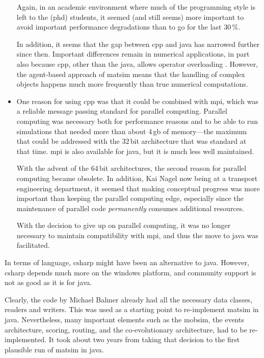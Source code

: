 \begin{itemize}
Again, in an academic environment where much of the programming style is left to the (\gls{phd}) students, it seemed (and still seems) more important to avoid important performance degradations than to go for the last 30\,\%.


In addition, it seems that the gap between \gls{cpp} and \gls{java} has narrowed further since then.  Important differences remain in numerical applications, in part also because \gls{cpp}, other than the \gls{java}, allows operator overloading \citep{..}.  However, the agent-based approach of \gls{matsim} means that the handling of complex objects happens much more frequently than true numerical computations.

\item One reason for using \gls{cpp} was that it could be combined with \gls{mpi}, which was a reliable message passing standard for parallel computing.  Parallel computing was necessary both for performance reasons and to be able to run simulations that needed more than about 4\,\gls{gb} of memory---the maximum that could be addressed with the 32\,bit architecture that was standard at that time.  \gls{mpi} is also available for \gls{java}, but it is much less well maintained.

With the advent of the 64\,bit architectures, the second reason for parallel computing became obsolete. In addition, Kai Nagel now being at a transport engineering department, it seemed that making conceptual progress was more important than keeping the parallel computing edge, especially since the maintenance of parallel code \emph{permanently} consumes additional resources.

With the decision to give up on parallel computing, it was no longer necessary to maintain compatibility with \gls{mpi}, and thus the move to \gls{java} was facilitated.

\end{itemize}
%
In terms of language, \gls{csharp} might have been an alternative to \gls{java}.  However, \gls{csharp} depends much more on the \gls{windows} platform, and community support is not as good as it is for \gls{java}.

Clearly, the code by Michael Balmer already had all the necessary data classes, readers and writers.  This was used as a starting point to re-implement \gls{matsim} in \gls{java}.  Nevertheless, many important elements such as the \gls{mobsim}, the events architecture, scoring, routing, and the co-evolutionary architecture, had to be re-implemented.  It took about two years from taking that decision to the first plausible run of \gls{matsim} in \gls{java}.

